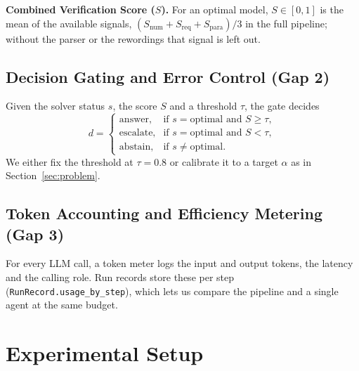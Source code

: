 \documentclass[conference]{IEEEtran}
\begin{document}
\textbf{Combined Verification Score ($S$).} For an optimal model, $S \in [0, 1]$ is the mean of the available signals, $(S_{\text{num}} + S_{\text{req}} + S_{\text{para}})/3$ in the full pipeline; without the parser or the rewordings that signal is left out.

\subsection{Decision Gating and Error Control (Gap 2)}
\label{sec:gate}
Given the solver status $s$, the score $S$ and a threshold $\tau$, the gate decides
\begin{equation}
d = \begin{cases}
\text{answer}, & \text{if } s = \text{optimal} \text{ and } S \ge \tau, \\
\text{escalate}, & \text{if } s = \text{optimal} \text{ and } S < \tau, \\
\text{abstain}, & \text{if } s \ne \text{optimal}.
\end{cases}
\end{equation}
We either fix the threshold at $\tau = 0.8$ or calibrate it to a target $\alpha$ as in Section~\ref{sec:problem}.

\subsection{Token Accounting and Efficiency Metering (Gap 3)}
For every LLM call, a token meter logs the input and output tokens, the latency and the calling role. Run records store these per step (\texttt{RunRecord.usage\_by\_step}), which lets us compare the pipeline and a single agent at the same budget.

\section{Experimental Setup}
\label{sec:setup}
\end{document}
